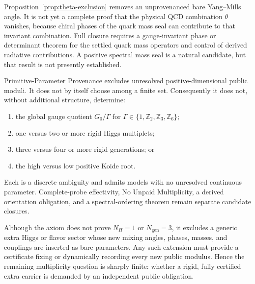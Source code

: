 \begin{remark}
Proposition~\ref{prop:theta-exclusion} removes an unprovenanced bare Yang--Mills
angle.  It is not yet a complete proof that the physical QCD combination
\(\bar\theta\) vanishes, because chiral phases of the quark mass seal can contribute
to that invariant combination.  Full closure requires a gauge-invariant phase or
determinant theorem for the settled quark mass operators and control of derived
radiative contributions.  A positive spectral mass seal is a natural candidate, but
that result is not presently established.
\end{remark}

\begin{proposition}
\label{prop:finite-choice-boundary}
Primitive-Parameter Provenance excludes unresolved positive-dimensional public
moduli.  It does not by itself choose among a finite set.  Consequently it does not,
without additional structure, determine:
\begin{enumerate}[label=\textup{(\roman*)},leftmargin=2.2em]
\item the global gauge quotient
      \(G_0/\Gamma\) for
      \(\Gamma\in\{1,\mathbb Z_2,\mathbb Z_3,\mathbb Z_6\}\);
\item one versus two or more rigid Higgs multiplets;
\item three versus four or more rigid generations; or
\item the high versus low positive Koide root.
\end{enumerate}
Each is a discrete ambiguity and admits models with no unresolved continuous
parameter.  Complete-probe effectivity, No Unpaid Multiplicity, a derived orientation
obligation, and a spectral-ordering theorem remain separate candidate closures.
\end{proposition}

\begin{corollary}
Although the axiom does not prove \(N_H=1\) or \(N_{\mathrm{gen}}=3\), it excludes a
generic extra Higgs or flavor sector whose new mixing angles, phases, masses, and
couplings are inserted as bare parameters.  Any such extension must provide a
certificate fixing or dynamically recording every new public modulus.  Hence the
remaining multiplicity question is sharply finite: whether a rigid, fully certified
extra carrier is demanded by an independent public obligation.
\end{corollary}

